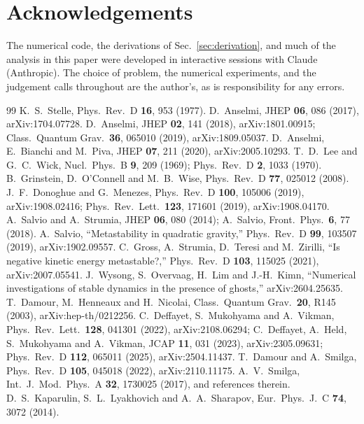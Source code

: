 \documentclass[11pt,a4paper]{article}
\begin{document}
\section*{Acknowledgements}
The numerical code, the derivations of Sec.~\ref{sec:derivation}, and much of the analysis in
this paper were developed in interactive sessions with Claude (Anthropic). The choice of problem,
the numerical experiments, and the judgement calls throughout are the author's, as is
responsibility for any errors.

\begin{thebibliography}{99}
\small
{} K.~S.~Stelle, Phys.\ Rev.\ D {\bf 16}, 953 (1977).
 D.~Anselmi, JHEP {\bf 06}, 086 (2017), arXiv:1704.07728.
 D.~Anselmi, JHEP {\bf 02}, 141 (2018), arXiv:1801.00915; Class.\ Quantum Grav.\ {\bf 36}, 065010 (2019), arXiv:1809.05037.
 D.~Anselmi, E.~Bianchi and M.~Piva, JHEP {\bf 07}, 211 (2020), arXiv:2005.10293.
 T.~D.~Lee and G.~C.~Wick, Nucl.\ Phys.\ B {\bf 9}, 209 (1969); Phys.\ Rev.\ D {\bf 2}, 1033 (1970).
 B.~Grinstein, D.~O'Connell and M.~B.~Wise, Phys.\ Rev.\ D {\bf 77}, 025012 (2008).
 J.~F.~Donoghue and G.~Menezes, Phys.\ Rev.\ D {\bf 100}, 105006 (2019), arXiv:1908.02416; Phys.\ Rev.\ Lett.\ {\bf 123}, 171601 (2019), arXiv:1908.04170.
 A.~Salvio and A.~Strumia, JHEP {\bf 06}, 080 (2014); A.~Salvio, Front.\ Phys.\ {\bf 6}, 77 (2018).
 A.~Salvio, ``Metastability in quadratic gravity,'' Phys.\ Rev.\ D {\bf 99}, 103507 (2019), arXiv:1902.09557.
 C.~Gross, A.~Strumia, D.~Teresi and M.~Zirilli, ``Is negative kinetic energy metastable?,'' Phys.\ Rev.\ D {\bf 103}, 115025 (2021), arXiv:2007.05541.
 J.~Wysong, S.~Overvaag, H.~Lim and J.-H.~Kimn, ``Numerical investigations of stable dynamics in the presence of ghosts,'' arXiv:2604.25635.
 T.~Damour, M.~Henneaux and H.~Nicolai, Class.\ Quantum Grav.\ {\bf 20}, R145 (2003), arXiv:hep-th/0212256.
 C.~Deffayet, S.~Mukohyama and A.~Vikman, Phys.\ Rev.\ Lett.\ {\bf 128}, 041301 (2022), arXiv:2108.06294; C.~Deffayet, A.~Held, S.~Mukohyama and A.~Vikman, JCAP {\bf 11}, 031 (2023), arXiv:2305.09631; Phys.\ Rev.\ D {\bf 112}, 065011 (2025), arXiv:2504.11437.
 T.~Damour and A.~Smilga, Phys.\ Rev.\ D {\bf 105}, 045018 (2022), arXiv:2110.11175.
 A.~V.~Smilga, Int.\ J.\ Mod.\ Phys.\ A {\bf 32}, 1730025 (2017), and references therein.
 D.~S.~Kaparulin, S.~L.~Lyakhovich and A.~A.~Sharapov, Eur.\ Phys.\ J.\ C {\bf 74}, 3072 (2014).

\end{thebibliography}
\end{document}
